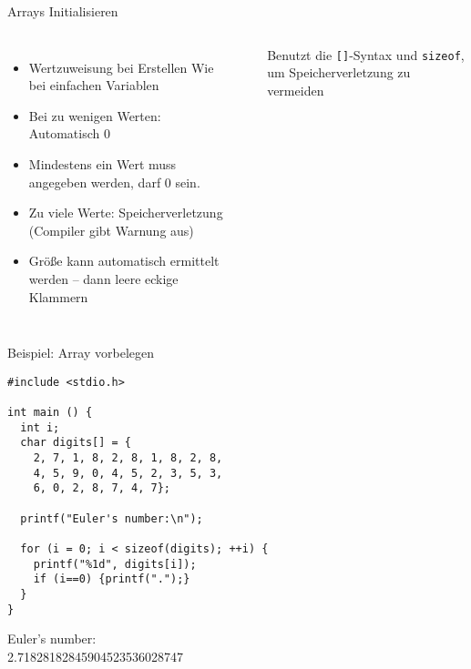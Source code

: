\begin{frame}{Arrays Initialisieren}
%
\begin{columns}[T]
\begin{itemize}
\item Wertzuweisung bei Erstellen\newline
	Wie bei einfachen Variablen
\item Bei zu wenigen Werten: Automatisch 0
\item Mindestens ein Wert muss angegeben werden, darf 0 sein.
\item Zu viele Werte: Speicherverletzung (Compiler gibt Warnung aus)
\item Größe kann automatisch ermittelt werden -- dann leere eckige Klammern
\end{itemize}
%
\begin{codebox}[Syntax]
\footnotesize {}
\footnotesize {}
\end{codebox}
%
\begin{hintbox}
Benutzt die \texttt{[]}-Syntax und \texttt{sizeof}, um Speicherverletzung zu vermeiden
\end{hintbox}
%
\end{columns}
%
\end{frame}


\begin{frame}[fragile]{Beispiel: Array vorbelegen}
%
%
\begin{codebox}[Code, equal height group = xmpEuler]
\begin{verbatim}
#include <stdio.h>

int main () {
  int i;
  char digits[] = {
    2, 7, 1, 8, 2, 8, 1, 8, 2, 8, 
    4, 5, 9, 0, 4, 5, 2, 3, 5, 3, 
    6, 0, 2, 8, 7, 4, 7};
  
  printf("Euler's number:\n");
  
  for (i = 0; i < sizeof(digits); ++i) {	
    printf("%1d", digits[i]);
    if (i==0) {printf(".");}
  }
}
\end{verbatim}
\end{codebox}%
%
%
\begin{cmdbox}[Ausgabe, equal height group = xmpEuler]
\footnotesize
Euler's number:\\
2.71828182845904523536028747
\end{cmdbox}
%
\end{frame}

